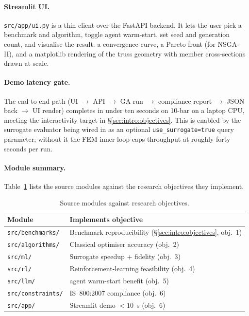 \paragraph{Streamlit UI.} \texttt{src/app/ui.py} is a thin client
over the FastAPI backend. It lets the user pick a benchmark and
algorithm, toggle agent warm-start, set seed and generation count,
and visualise the result: a convergence curve, a Pareto front
(for NSGA-II), and a matplotlib rendering of the truss geometry
with member cross-sections drawn at scale.

\paragraph{Demo latency gate.} The end-to-end path
(UI $\to$ API $\to$ GA run $\to$ compliance report $\to$ JSON
back $\to$ UI render) completes in under ten seconds on 10-bar on
a laptop CPU, meeting the interactivity target in
\S\ref{sec:intro:objectives}. This is enabled by the surrogate
evaluator being wired in as an optional \texttt{use\_surrogate=true}
query parameter; without it the FEM inner loop caps throughput at
roughly forty seconds per run.

\paragraph{Module summary.} Table~\ref{tab:modules} lists the
source modules against the research objectives they implement.

\begin{table}[htbp]
  \centering
  \caption{Source modules against research objectives.}
  \label{tab:modules}
  \begin{tabular}{ll}
    \toprule
    Module & Implements objective \\
    \midrule
    \texttt{src/benchmarks/}   & Benchmark reproducibility (\S\ref{sec:intro:objectives}, obj.~1) \\
    \texttt{src/algorithms/}   & Classical optimiser accuracy (obj.~2) \\
    \texttt{src/ml/}           & Surrogate speedup + fidelity (obj.~3) \\
    \texttt{src/rl/}           & Reinforcement-learning feasibility (obj.~4) \\
    \texttt{src/llm/}          & agent warm-start benefit (obj.~5) \\
    \texttt{src/constraints/}  & IS~800:2007 compliance (obj.~6) \\
    \texttt{src/app/}          & Streamlit demo \mbox{$<\num{10}$~s}  (obj.~6) \\
    \bottomrule
  \end{tabular}
\end{table}

